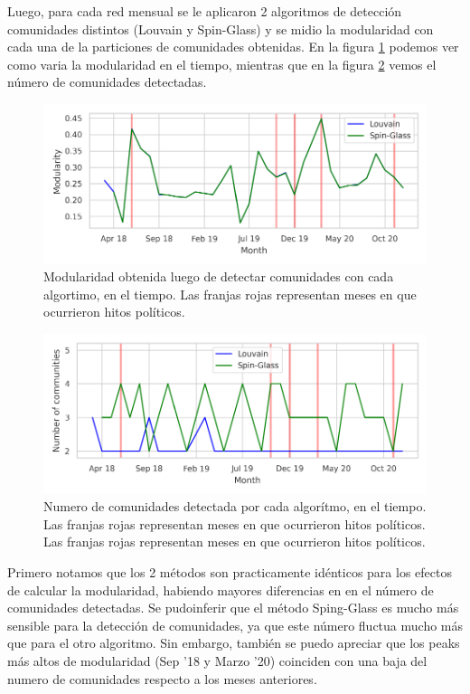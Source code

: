 \documentclass{proyectotesis}
\begin{document}
Luego, para cada red mensual se le aplicaron 2 algoritmos de detección comunidades distintos (Louvain y Spin-Glass) y se midio la modularidad con cada una de la particiones de comunidades obtenidas. En la figura \ref{modfig} podemos ver como varia la modularidad en el tiempo, mientras que en la figura \ref{N} vemos el número de comunidades detectadas.\\
\begin{figure}[h!]
    \centering
    \includegraphics[width=0.95\linewidth]{mod.pdf} 
    \vspace{-5mm}
    \caption{Modularidad obtenida luego de detectar comunidades con cada algortimo, en el tiempo. Las franjas rojas representan meses en que ocurrieron hitos políticos.}
    \label{modfig}
\end{figure}
\begin{figure}[h!]
    \centering
    \includegraphics[width=0.95\linewidth]{N.pdf} 
    \vspace{-5mm}
    \caption{Numero de comunidades detectada por cada algorítmo, en el tiempo. Las franjas rojas representan meses en que ocurrieron hitos políticos. Las franjas rojas representan meses en que ocurrieron hitos políticos.}
    \label{N}
\end{figure}

Primero notamos que los 2 métodos son practicamente idénticos para los efectos de calcular la modularidad, habiendo mayores diferencias en en el número de comunidades detectadas. Se pudoinferir que el método Sping-Glass es mucho más sensible para la detección de comunidades, ya que este número fluctua mucho más que para el otro algoritmo. Sin embargo, también se puedo apreciar que los peaks más altos de modularidad (Sep ’18 y Marzo ’20) coinciden con una baja del numero de comunidades respecto a los meses anteriores.
\end{document}
